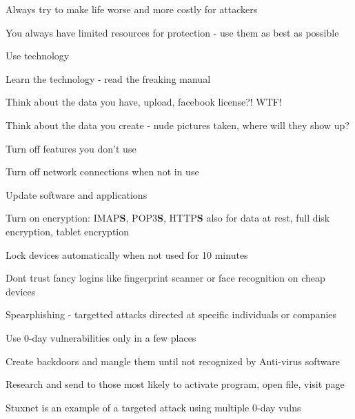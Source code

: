 \documentclass[Screen16to9,17pt]{foils}
\begin{document}
\vskip 1cm

\centerline{Always try to make life worse and more costly for attackers}




\begin{list1}
\item You always have limited resources for protection - use them as best as possible
\end{list1}



\begin{list1}
\item Use technology
\item Learn the technology - read the freaking manual
\item Think about the data you have, upload, facebook license?! WTF!
\item Think about the data you create - nude pictures taken, where will they show up?
\begin{list2}
\item Turn off features you don't use
\item Turn off network connections when not in use
\item Update software and applications
\item Turn on encryption: IMAP{\bf S}, POP3{\bf S},
  HTTP{\bf S} also for data at rest, full disk encryption, tablet encryption
\item Lock devices automatically when not used for 10 minutes
\item Dont trust fancy logins like fingerprint scanner or face recognition on cheap devices
\end{list2}
\end{list1}




Spearphishing - targetted attacks directed at specific individuals or companies

\begin{list2}
\item Use 0-day vulnerabilities only in a few places
\item Create backdoors and mangle them until not recognized by Anti-virus software
\item Research and send to those most likely to activate program, open file, visit page
\item Stuxnet is an example of a targeted attack using multiple 0-day vulns
\end{list2}
\end{document}
